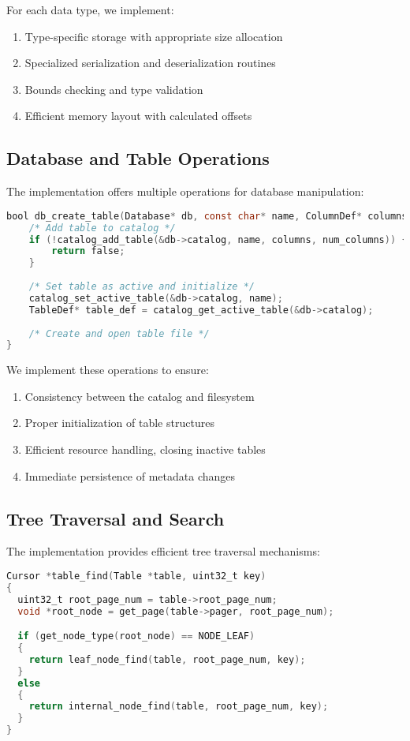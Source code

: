 \documentclass[12pt,a4paper]{article}  %
\begin{document}
For each data type, we implement:
\begin{enumerate}
    \item Type-specific storage with appropriate size allocation
    \item Specialized serialization and deserialization routines
    \item Bounds checking and type validation
    \item Efficient memory layout with calculated offsets
\end{enumerate}

\subsection{Database and Table Operations}

The implementation offers multiple operations for database manipulation:

\begin{lstlisting}[language=C]
bool db_create_table(Database* db, const char* name, ColumnDef* columns, uint32_t num_columns) {
    /* Add table to catalog */
    if (!catalog_add_table(&db->catalog, name, columns, num_columns)) {
        return false;
    }
    
    /* Set table as active and initialize */
    catalog_set_active_table(&db->catalog, name);
    TableDef* table_def = catalog_get_active_table(&db->catalog);
    
    /* Create and open table file */
}
\end{lstlisting}

We implement these operations to ensure:
\begin{enumerate}
    \item Consistency between the catalog and filesystem
    \item Proper initialization of table structures
    \item Efficient resource handling, closing inactive tables
    \item Immediate persistence of metadata changes
\end{enumerate}

\subsection{Tree Traversal and Search}

The implementation provides efficient tree traversal mechanisms:

\begin{lstlisting}[language=C]
Cursor *table_find(Table *table, uint32_t key)
{
  uint32_t root_page_num = table->root_page_num;
  void *root_node = get_page(table->pager, root_page_num);

  if (get_node_type(root_node) == NODE_LEAF)
  {
    return leaf_node_find(table, root_page_num, key);
  }
  else
  {
    return internal_node_find(table, root_page_num, key);
  }
}
\end{lstlisting}
\end{document}
